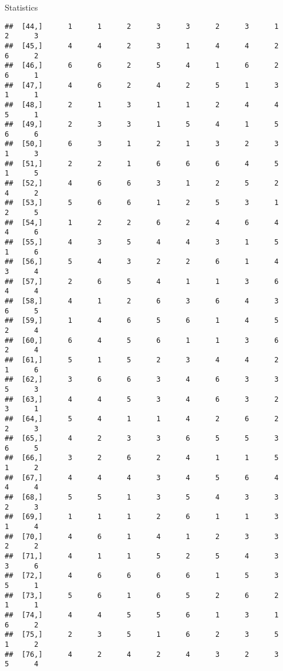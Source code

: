 \documentclass[
  ignorenonframetext,
]{beamer}
\begin{document}
\begin{frame}[fragile]{Statistics}
\begin{verbatim}
##  [44,]      1      1      2      3      3      2      3      1      2      3
##  [45,]      4      4      2      3      1      4      4      2      6      2
##  [46,]      6      6      2      5      4      1      6      2      6      1
##  [47,]      4      6      2      4      2      5      1      3      1      1
##  [48,]      2      1      3      1      1      2      4      4      5      1
##  [49,]      2      3      3      1      5      4      1      5      6      6
##  [50,]      6      3      1      2      1      3      2      3      1      3
##  [51,]      2      2      1      6      6      6      4      5      1      5
##  [52,]      4      6      6      3      1      2      5      2      4      2
##  [53,]      5      6      6      1      2      5      3      1      2      5
##  [54,]      1      2      2      6      2      4      6      4      4      6
##  [55,]      4      3      5      4      4      3      1      5      1      6
##  [56,]      5      4      3      2      2      6      1      4      3      4
##  [57,]      2      6      5      4      1      1      3      6      4      4
##  [58,]      4      1      2      6      3      6      4      3      6      5
##  [59,]      1      4      6      5      6      1      4      5      2      4
##  [60,]      6      4      5      6      1      1      3      6      2      4
##  [61,]      5      1      5      2      3      4      4      2      1      6
##  [62,]      3      6      6      3      4      6      3      3      5      3
##  [63,]      4      4      5      3      4      6      3      2      3      1
##  [64,]      5      4      1      1      4      2      6      2      2      3
##  [65,]      4      2      3      3      6      5      5      3      6      5
##  [66,]      3      2      6      2      4      1      1      5      1      2
##  [67,]      4      4      4      3      4      5      6      4      4      4
##  [68,]      5      5      1      3      5      4      3      3      2      3
##  [69,]      1      1      1      2      6      1      1      3      1      4
##  [70,]      4      6      1      4      1      2      3      3      2      2
##  [71,]      4      1      1      5      2      5      4      3      3      6
##  [72,]      4      6      6      6      6      1      5      3      5      1
##  [73,]      5      6      1      6      5      2      6      2      1      1
##  [74,]      4      4      5      5      6      1      3      1      6      2
##  [75,]      2      3      5      1      6      2      3      5      1      2
##  [76,]      4      2      4      2      4      3      2      3      5      4

\end{verbatim}
\end{frame}
\end{document}
